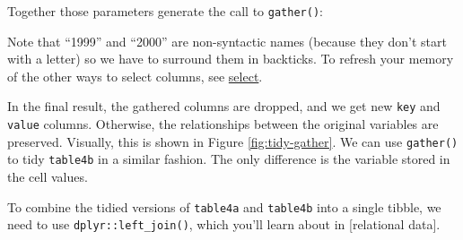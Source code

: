\documentclass[]{book}
\newenvironment{Shaded}{\begin{snugshade}}{\end{snugshade}}
\newcommand{\KeywordTok}[1]{\textcolor[rgb]{0.13,0.29,0.53}{\textbf{#1}}}
\newcommand{\DataTypeTok}[1]{\textcolor[rgb]{0.13,0.29,0.53}{#1}}
\newcommand{\StringTok}[1]{\textcolor[rgb]{0.31,0.60,0.02}{#1}}
\newcommand{\CommentTok}[1]{\textcolor[rgb]{0.56,0.35,0.01}{\textit{#1}}}
\newcommand{\OperatorTok}[1]{\textcolor[rgb]{0.81,0.36,0.00}{\textbf{#1}}}
\newcommand{\NormalTok}[1]{#1}
\theoremstyle{definition}
\theoremstyle{definition}
\theoremstyle{definition}
\theoremstyle{remark}
\let\BeginKnitrBlock\begin \let\EndKnitrBlock\end
\begin{document}
Together those parameters generate the call to \texttt{gather()}:

\begin{Shaded}
\end{Shaded}

\BeginKnitrBlock{rmdimportant}
Note that ``1999'' and ``2000'' are non-syntactic names (because they
don't start with a letter) so we have to surround them in backticks. To
refresh your memory of the other ways to select columns, see
\protect\hyperlink{select}{select}.
\EndKnitrBlock{rmdimportant}

In the final result, the gathered columns are dropped, and we get new
\texttt{key} and \texttt{value} columns. Otherwise, the relationships
between the original variables are preserved. Visually, this is shown in
Figure \ref{fig:tidy-gather}. We can use \texttt{gather()} to tidy
\texttt{table4b} in a similar fashion. The only difference is the
variable stored in the cell values.

To combine the tidied versions of \texttt{table4a} and \texttt{table4b}
into a single tibble, we need to use \texttt{dplyr::left\_join()}, which
you'll learn about in {[}relational data{]}.
\end{document}
